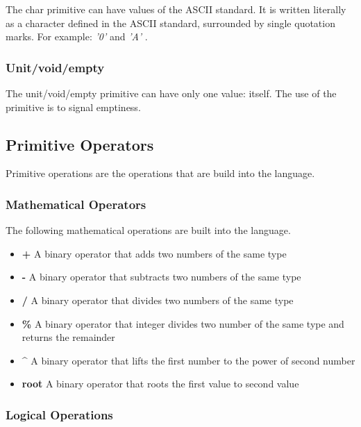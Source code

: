 The char primitive can have values of the ASCII standard. It is written literally as a character defined in the ASCII standard, surrounded by single quotation marks. For example: \emph{ '0' } and \emph{ 'A' }.

\subsubsection{Unit/void/empty}
\label{sec:unit/empty/void}

The unit/void/empty primitive can have only one value: itself. The use of the primitive is to signal emptiness.

\subsection{Primitive Operators}
\label{sec:primitiveOps}

Primitive operations are the operations that are build into the language.

\subsubsection{Mathematical Operators}
\label{sec:mathOps}

The following mathematical operations are built into the language.

\begin{itemize}
  \item \textbf{+} A binary operator that adds two numbers of the same type
  \item \textbf{-} A binary operator that subtracts two numbers of the same type
  \item \textbf{/} A binary operator that divides two numbers of the same type
  \item \textbf{\%} A binary operator that integer divides two number of the same type and returns the remainder
  \item \textbf{\^}  A binary operator that lifts the first number to the power of second number
  \item \textbf{root} A binary operator that roots the first value to second value
\end{itemize}


\subsubsection{Logical Operations}
\label{sec:logicOps}

